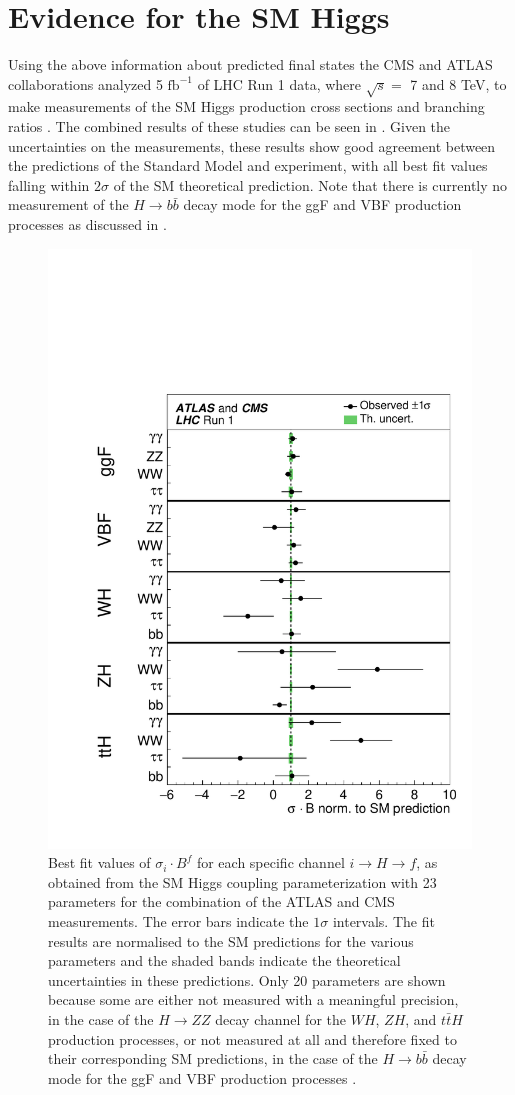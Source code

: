 \section{Evidence for the SM Higgs} \label{sec:higgs:higgs_evidence}

Using the above information about predicted final states the CMS and ATLAS
collaborations analyzed 5 $\text{fb}^{-1}$ of LHC Run 1 data, where $\sqrt{s} =
$ 7 and 8 TeV, to make measurements of the SM Higgs production cross sections
and branching ratios \cite{Khachatryan:2016vau}.  The combined results of these
studies can be seen in
.
Given the uncertainties on the measurements, these results show good agreement
between the predictions of the Standard Model and experiment, with all best fit
values falling within $2\sigma$ of the SM theoretical prediction. Note that
there is currently no measurement of the $H \rightarrow b\bar{b}$ decay mode
for the ggF and VBF production processes  as discussed in
.

\begin{figure}[!htbp]
  \begin{center}
    \includegraphics[width=0.5\linewidth]{figures/higgs/higgs_production_measurement.pdf}
    \caption{ Best fit values of $\sigma_{i} \cdot B^{f}$ for each specific channel $i \rightarrow H \rightarrow f$, as obtained from the SM Higgs coupling parameterization with 23 parameters for the combination of the ATLAS and CMS measurements. The error bars indicate the $1\sigma$ intervals. The fit results are normalised to the SM predictions for the various parameters and the shaded bands indicate the theoretical uncertainties in these predictions. Only 20 parameters are shown because some are either not measured with a meaningful precision, in the case of the $H \rightarrow ZZ$ decay channel for the $WH$, $ZH$, and $t\bar{t}H$ production processes, or not measured at all and therefore fixed to their corresponding SM predictions, in the case of the $H \rightarrow b\bar{b}$ decay mode for the ggF and VBF production processes \cite{Khachatryan:2016vau}.}
    \label{fig:higgs_production_measurement}
  \end{center}
\end{figure}

